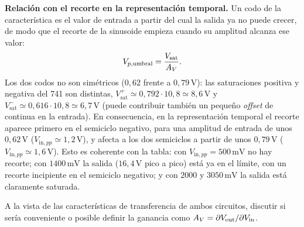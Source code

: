 \begin{respuesta}
\textbf{Relación con el recorte en la representación temporal.} Un codo de la característica es el valor de
entrada a partir del cual la salida ya no puede crecer, de modo que el recorte de la sinusoide empieza cuando
su amplitud alcanza ese valor:
\begin{equation}\label{eq:n-umbral}
  V_{p,\mathrm{umbral}}=\frac{V_{\mathrm{sat}}}{A_V} .
\end{equation}
Los dos codos no son simétricos ($0{,}62$ frente a $0{,}79\,\mathrm{V}$): las saturaciones positiva y negativa del 741
son distintas, $V_{\mathrm{sat}}^{+}\simeq0{,}792\cdot10{,}8\simeq8{,}6\,\mathrm{V}$ y $V_{\mathrm{sat}}^{-}\simeq0{,}616\cdot10{,}8\simeq6{,}7\,\mathrm{V}$
(puede contribuir también un pequeño \emph{offset} de continua en la entrada). En consecuencia, en la
representación temporal el recorte aparece primero en el semiciclo negativo, para una amplitud de entrada de
unos $0{,}62\,\mathrm{V}$ ($V_{\mathrm{in},pp}\simeq1{,}2\,\mathrm{V}$), y afecta a los dos semiciclos a partir de unos $0{,}79\,\mathrm{V}$
($V_{\mathrm{in},pp}\simeq1{,}6\,\mathrm{V}$). Esto es coherente con la tabla: con $V_{\mathrm{in},pp}=500\,\mathrm{mV}$ no hay
recorte; con $1400\,\mathrm{mV}$ la salida ($16{,}4\,\mathrm{V}$ pico a pico) está ya en el límite, con un recorte
incipiente en el semiciclo negativo; y con $2000$ y $3050\,\mathrm{mV}$ la salida está claramente saturada.
\end{respuesta}

\begin{pregunta}
A la vista de las características de transferencia de ambos circuitos, discutir si sería conveniente o
posible definir la ganancia como $A_V=\partial V_{\mathrm{out}}/\partial V_{\mathrm{in}}$.
\end{pregunta}

